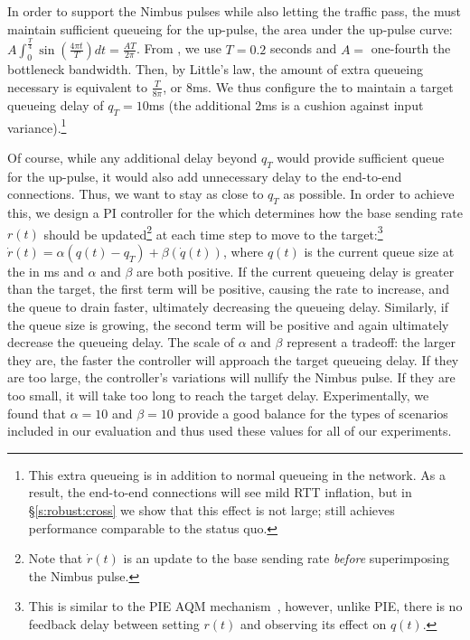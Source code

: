 In order to support the Nimbus pulses while also letting the traffic pass,
the \inbox must maintain sufficient queueing for the up-pulse,
\ie the area under the up-pulse curve: 
$A \int_0^{\frac{T}{4}} \sin(\frac{4\pi{}t}{T}) dt = \frac{AT}{2\pi}$.
From \cite{nimbus-arxiv}, we use $T = 0.2$ seconds and $A =$ one-fourth the bottleneck bandwidth. Then, by Little's law, the amount of extra queueing necessary is equivalent to
$\frac{T}{8\pi}$, or $8$ms. %
We thus configure the \inbox to maintain a target queueing delay of $q_T = 10$ms (the additional $2$ms is a cushion against input variance).\footnote{This extra queueing is in addition to normal queueing in the network. As a result, the end-to-end connections will see mild RTT inflation, but in \S\ref{s:robust:cross} we show that this effect is not large; \name still achieves performance comparable to the status quo.}

Of course, while any additional delay beyond $q_T$ would provide sufficient queue for the up-pulse, it would also add unnecessary delay to the end-to-end connections. Thus, we want to stay as close to $q_T$ as possible. In order to achieve this,
we design a PI controller for the \inbox which determines how the base sending rate $r(t)$ should be updated\footnote{Note that $\dot{r}(t)$ is an update to the base sending rate \emph{before} superimposing the Nimbus pulse.}
at each time step to move to the target:\footnote{This is similar to the PIE AQM mechanism~\cite{pie}, however, unlike PIE, there is no feedback delay between setting $r(t)$ and observing its effect on $q(t)$.}
$\dot{r}(t) = \alpha (q(t) - q_T) + \beta (\dot{q}(t))$, where $q(t)$ is the current queue size at the \inbox in ms and $\alpha$ and $\beta$ are both positive.
If the current queueing delay is greater than the target, the first term will be positive, causing the rate to increase, and the queue to drain faster, ultimately decreasing the queueing delay. Similarly, if the queue size is growing, the second term will be positive and again ultimately decrease the queueing delay. The scale of $\alpha$ and $\beta$ represent a tradeoff: the larger they are, the faster the controller will approach the target queueing delay. If they are too large, the controller's variations will nullify the Nimbus pulse. If they are too small, it will take too long to reach the target delay. Experimentally, we found that $\alpha=10$ and $\beta = 10$ provide a good balance for the types of scenarios included in our evaluation and thus used these values for all of our experiments.



